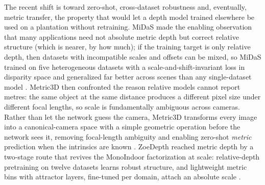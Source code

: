 The recent shift is toward zero-shot, cross-dataset robustness and, eventually, metric transfer, the property that would let a depth model trained elsewhere be used on a plantation without retraining. MiDaS made the enabling observation that many applications need not absolute metric depth but correct relative structure (which is nearer, by how much); if the training target is only relative depth, then datasets with incompatible scales and offsets can be mixed, so MiDaS trained on five heterogeneous datasets with a scale-and-shift-invariant loss in disparity space and generalized far better across scenes than any single-dataset model \cite{ranftl2022midas}. Metric3D then confronted the reason relative models cannot report metres: the same object at the same distance produces a different pixel size under different focal lengths, so scale is fundamentally ambiguous across cameras. Rather than let the network guess the camera, Metric3D transforms every image into a canonical-camera space with a simple geometric operation before the network sees it, removing focal-length ambiguity and enabling zero-shot \emph{metric} prediction when the intrinsics are known \cite{yin2023metric3d}. ZoeDepth reached metric depth by a two-stage route that revives the MonoIndoor factorization at scale: relative-depth pretraining on twelve datasets learns robust structure, and lightweight metric bins with attractor layers, fine-tuned per domain, attach an absolute scale \cite{bhat2023zoedepth}.

